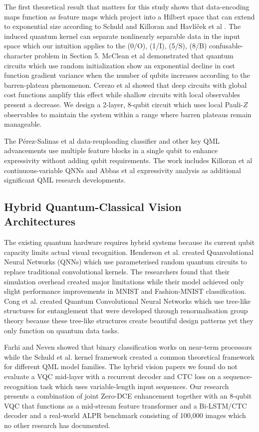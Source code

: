 \documentclass{ieeeaccess}
\begin{document}
The first theoretical result that matters for this study shows that data-encoding maps function as feature maps which project into a Hilbert space that can extend to exponential size according to Schuld and Killoran \cite{b35} and Havlíček et al \cite{b26}. The induced quantum kernel can separate nonlinearly separable data in the input space which our intuition applies to the (0/O), (1/I), (5/S), (8/B) confusable-character problem in Section 5. McClean et al \cite{b4} demonstrated that quantum circuits which use random initialization show an exponential decline in cost function gradient variance when the number of qubits increases according to the barren-plateau phenomenon. Cerezo et al \cite{b38} showed that deep circuits with global cost functions amplify this effect while shallow circuits with local observables present a decrease. We design a 2-layer, 8-qubit circuit which uses local Pauli-$Z$ observables to maintain the system within a range where barren plateaus remain manageable.

The Pérez-Salinas et al \cite{b40} data-reuploading classifier and other key QML advancements use multiple feature blocks in a single qubit to enhance expressivity without adding qubit requirements. The work includes Killoran et al \cite{b39} continuous-variable QNNs and Abbas et al \cite{b29} expressivity analysis as additional significant QML research developments.

\subsection{Hybrid Quantum-Classical Vision Architectures}
The existing quantum hardware requires hybrid systems because its current qubit capacity limits actual visual recognition. Henderson et al. \cite{b11} created Quanvolutional Neural Networks (QNNs) which use parameterised random quantum circuits to replace traditional convolutional kernels. The researchers found that their simulation overhead created major limitations while their model achieved only slight performance improvements in MNIST and Fashion-MNIST classification. Cong et al. \cite{b27} created Quantum Convolutional Neural Networks which use tree-like structures for entanglement that were developed through renormalisation group theory because these tree-like structures create beautiful design patterns yet they only function on quantum data tasks.

Farhi and Neven \cite{b28} showed that binary classification works on near-term processors while the Schuld et al. \cite{b5} kernel framework created a common theoretical framework for different QML model families. The hybrid vision papers we found do not evaluate a VQC mid-layer with a recurrent decoder and CTC loss on a sequence-recognition task which uses variable-length input sequences. Our research presents a combination of joint Zero-DCE enhancement together with an 8-qubit VQC that functions as a mid-stream feature transformer and a Bi-LSTM/CTC decoder and a real-world ALPR benchmark consisting of 100,000 images which no other research has documented.
\end{document}
